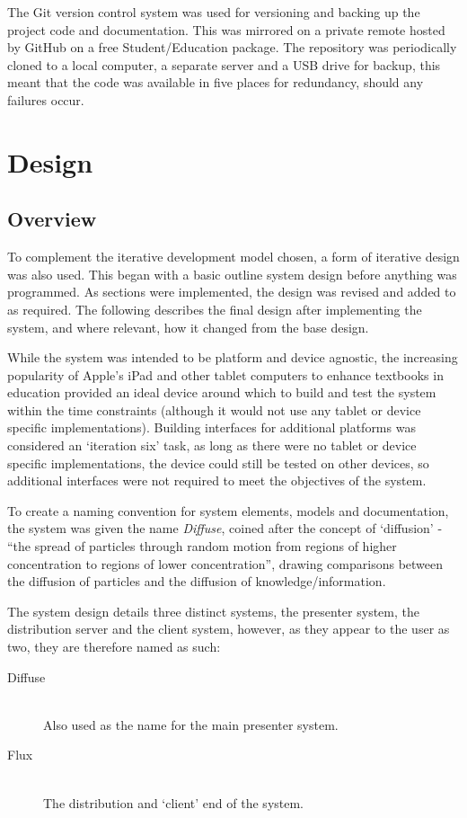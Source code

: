 \documentclass[a4papert,11pt,notitlepage]{ltxdoc}
\begin{document}
The Git\cite{git:web} version control system was used for versioning and backing up the project code and documentation. This was mirrored on a private remote hosted by GitHub\cite{github:web} on a free Student/Education package. The repository was periodically cloned to a local computer, a separate server and a USB drive for backup, this meant that the code was available in five places for redundancy, should any failures occur.

\pagebreak
\section{Design}
\subsection{Overview}
To complement the iterative development model chosen, a form of iterative design was also used. This began with a basic outline system design before anything was programmed. As sections were implemented, the design was revised and added to as required. The following describes the final design after implementing the system, and where relevant, how it changed from the base design.

While the system was intended to be platform and device agnostic, the increasing popularity of Apple's iPad and other tablet computers to enhance textbooks in education provided an ideal device around which to build and test the system within the time constraints (although it would not use any tablet or device specific implementations). Building interfaces for additional platforms was considered an `iteration six' task, as long as there were no tablet or device specific implementations, the device could still be tested on other devices, so additional interfaces were not required to meet the objectives of the system.

To create a naming convention for system elements, models and documentation, the system was given the name \emph{Diffuse}, coined after the concept of `diffusion' - ``the spread of particles through random motion from regions of higher concentration to regions of lower concentration''\cite{diffusionwikipedia:web}, drawing comparisons between the diffusion of particles and the diffusion of knowledge/information.

The system design details three distinct systems, the presenter system, the distribution server and the client system, however, as they appear to the user as two, they are therefore named as such:
\begin{description}
\item[Diffuse] \hfill \\
Also used as the name for the main presenter system.
\item[Flux] \hfill \\
The distribution and `client' end of the system.
\end{description}
\end{document}
